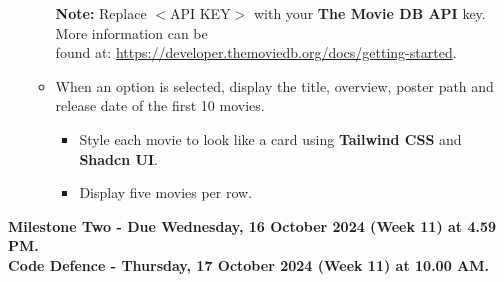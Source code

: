\documentclass{article}
\begin{document}
\begin{itemize}
\begin{itemize}
\begin{itemize}
	\end{itemize}
	\textbf{Note:} Replace $<$API KEY$>$ with your \textbf{The Movie DB API} key. More information can be \\found at: \href{https://developer.themoviedb.org/docs/getting-started}{https://developer.themoviedb.org/docs/getting-started}.
	\item When an option is selected, display the title, overview, poster path and release date of the first 10 movies.
	\begin{itemize}
		\item Style each movie to look like a card using \textbf{Tailwind CSS} and \textbf{Shadcn UI}.
		\item Display five movies per row.
	\end{itemize}
	\end{itemize}
\end{itemize}
	\textbf{Milestone Two - Due Wednesday, 16 October 2024 (Week 11) at 4.59 PM. \\ Code Defence - Thursday, 17 October 2024 (Week 11) at 10.00 AM.}
\end{document}
